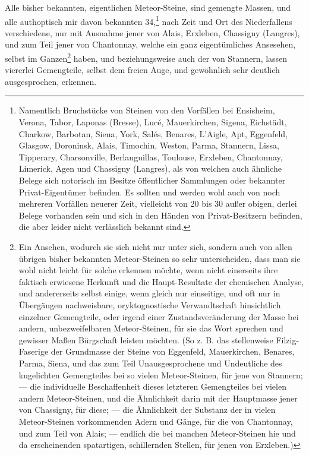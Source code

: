 \documentclass[a4paper, 11pt, oneside, german]{article}
\begin{document}
Alle bisher bekannten, eigentlichen Meteor-Steine, sind gemengte Massen, und alle authoptisch mir davon bekannten 34,\footnote{Namentlich Bruchstücke von Steinen von den Vorfällen bei Ensisheim, Verona, Tabor, Laponas (Bresse), Lucé, Mauerkirchen, Sigena, Eichstädt, Charkow, Barbotan, Siena, York, Salés, Benares, L'Aigle, Apt, Eggenfeld, Glasgow, Doroninsk, Alais, Timochin, Weston, Parma, Stannern, Lissa, Tipperary, Charsonville, Berlanguillas, Toulouse, Erxleben, Chantonnay, Limerick, Agen und Chassigny (Langres), als von welchen auch ähnliche Belege sich notorisch im Besitze öffentlicher Sammlungen oder bekannter Privat-Eigentümer befinden. Es sollten und werden wohl auch von noch mehreren Vorfällen neuerer Zeit, vielleicht von 20 bis 30 außer obigen, derlei Belege vorhanden sein und sich in den Händen von Privat-Besitzern befinden, die aber leider nicht verlässlich bekannt sind.} nach Zeit und Ort des Niederfallens verschiedene, nur mit Ausnahme jener von Alais, Erxleben, Chassigny (Langres), und zum Teil jener von Chantonnay, welche ein ganz eigentümliches Ansesehen, selbst im Ganzen\footnote{Ein Ansehen, wodurch sie sich nicht nur unter sich, sondern auch von allen übrigen bisher bekannten Meteor-Steinen so sehr unterscheiden, dass man sie wohl nicht leicht für solche erkennen möchte, wenn nicht einerseits ihre faktisch erwiesene Herkunft und die Haupt-Resultate der chemischen Analyse, und andererseits selbst einige, wenn gleich nur einseitige, und oft nur in Übergängen nachweisbare, oryktognostische Verwandtschaft hinsichtlich einzelner Gemengteile, oder irgend einer Zustandsveränderung der Masse bei andern, unbezweifelbaren Meteor-Steinen, für sie das Wort sprechen und gewisser Maßen Bürgschaft leisten möchten. (So z. B. das stellenweise Filzig-Faserige der Grundmasse der Steine von Eggenfeld, Mauerkirchen, Benares, Parma, Siena, und das zum Teil Unausgesprochene und Undeutliche des kugelichten Gemengteiles bei so vielen Meteor-Steinen, für jene von Stannern; --- die individuelle Beschaffenheit dieses letzteren Gemengteiles bei vielen andern Meteor-Steinen, und die Ähnlichkeit darin mit der Hauptmasse jener von Chassigny, für diese; --- die Ähnlichkeit der Substanz der in vielen Meteor-Steinen vorkommenden Adern und Gänge, für die von Chantonnay, und zum Teil von Alais; --- endlich die bei manchen Meteor-Steinen hie und da erscheinenden spatartigen, schillernden Stellen, für jenen von Erxleben.)} haben, und beziehungsweise auch der von Stannern, lassen viererlei Gemengteile, selbst dem freien Auge, und gewöhnlich sehr deutlich ausgesprochen, erkennen.
\end{document}
